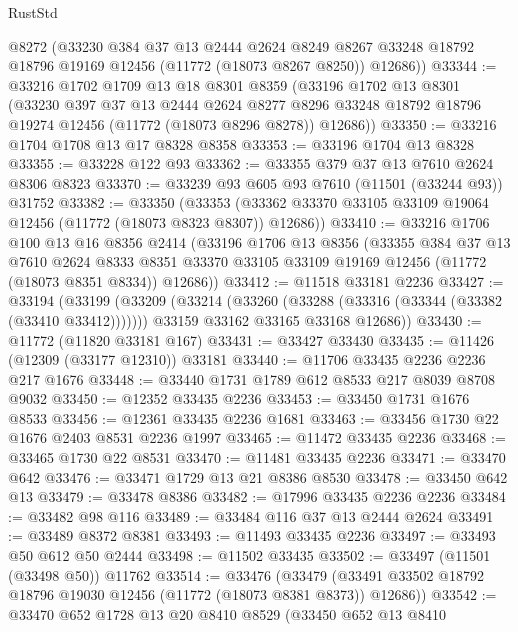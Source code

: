 \begin{lexlean}{RustStd}
\begin{coremodule}
      @8272
      (@33230
        @384
        @37
        @13
        @2444
        @2624
        @8249
        @8267
        @33248
        @18792
        @18796
        @19169
        @12456
        (@11772 (@18073 @8267 @8250))
        @12686))
@33344 := @33216
    @1702
    @1709
    @13
    @18
    @8301
    @8359
    (@33196
      @1702
      @13
      @8301
      (@33230
        @397
        @37
        @13
        @2444
        @2624
        @8277
        @8296
        @33248
        @18792
        @18796
        @19274
        @12456
        (@11772 (@18073 @8296 @8278))
        @12686))
@33350 := @33216 @1704 @1708 @13 @17 @8328 @8358
@33353 := @33196 @1704 @13 @8328
@33355 := @33228 @122 @93
@33362 := @33355 @379 @37 @13 @7610 @2624 @8306 @8323
@33370 := @33239 @93 @605 @93 @7610 (@11501 (@33244 @93)) @31752
@33382 := @33350
    (@33353 (@33362 @33370 @33105 @33109 @19064 @12456 (@11772 (@18073 @8323 @8307)) @12686))
@33410 := @33216
    @1706
    @100
    @13
    @16
    @8356
    @2414
    (@33196
      @1706
      @13
      @8356
      (@33355
        @384
        @37
        @13
        @7610
        @2624
        @8333
        @8351
        @33370
        @33105
        @33109
        @19169
        @12456
        (@11772 (@18073 @8351 @8334))
        @12686))
@33412 := @11518 @33181 @2236
@33427 := @33194
    (@33199
      (@33209
        (@33214 (@33260 (@33288 (@33316 (@33344 (@33382 (@33410 @33412)))))))
        @33159
        @33162
        @33165
        @33168
        @12686))
@33430 := @11772 (@11820 @33181 @167)
@33431 := @33427 @33430
@33435 := @11426 (@12309 (@33177 @12310)) @33181
@33440 := @11706 @33435 @2236 @2236 @217 @1676
@33448 := @33440 @1731 @1789 @612 @8533 @217 @8039 @8708 @9032
@33450 := @12352 @33435 @2236
@33453 := @33450 @1731 @1676 @8533
@33456 := @12361 @33435 @2236 @1681
@33463 := @33456 @1730 @22 @1676 @2403 @8531 @2236 @1997
@33465 := @11472 @33435 @2236
@33468 := @33465 @1730 @22 @8531
@33470 := @11481 @33435 @2236
@33471 := @33470 @642
@33476 := @33471 @1729 @13 @21 @8386 @8530
@33478 := @33450 @642 @13
@33479 := @33478 @8386
@33482 := @17996 @33435 @2236 @2236
@33484 := @33482 @98 @116
@33489 := @33484 @116 @37 @13 @2444 @2624
@33491 := @33489 @8372 @8381
@33493 := @11493 @33435 @2236
@33497 := @33493 @50 @612 @50 @2444
@33498 := @11502 @33435
@33502 := @33497 (@11501 (@33498 @50)) @11762
@33514 := @33476
    (@33479 (@33491 @33502 @18792 @18796 @19030 @12456 (@11772 (@18073 @8381 @8373)) @12686))
@33542 := @33470
    @652
    @1728
    @13
    @20
    @8410
    @8529
    (@33450
      @652
      @13
      @8410

\end{coremodule}
\end{lexlean}
